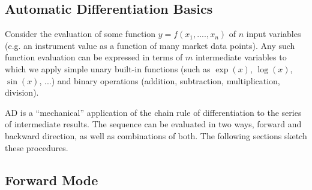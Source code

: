 \subsection{Automatic Differentiation Basics}
\label{sec:ad}

Consider the evaluation of some function $y=f(x_1, ...., x_n)$ of $n$
input variables (e.g. an instrument value as a function of many market
data points).  Any such function evaluation can be expressed in terms
of $m$ intermediate variables to which we apply simple unary built-in
functions (such as $\exp(x)$, $\log(x)$, $\sin(x)$, ...) and binary
operations (addition, subtraction, multiplication, division).

AD is a ``mechanical'' application of the chain rule of differentiation
to the series of intermediate results. The sequence can be evaluated
in two ways, forward and backward direction, as well as combinations of
both. The following sections sketch these procedures.

\subsection*{Forward Mode}


